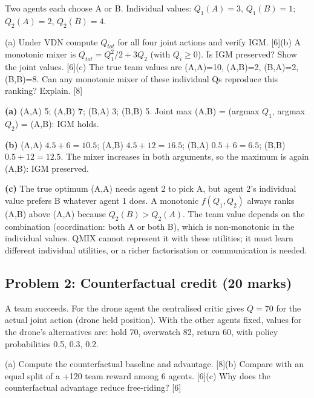 \documentclass[11pt]{article}
\begin{document}
\begin{prob}Two agents each choose A or B. Individual values: $Q_1(A)=3$, $Q_1(B)=1$; $Q_2(A)=2$, $Q_2(B)=4$.

(a) Under VDN compute $Q_{tot}$ for all four joint actions and verify IGM. [6]\newline (b) A monotonic mixer is $Q_{tot}=Q_1^2/2+3Q_2$ (with $Q_i\ge0$). Is IGM preserved? Show the joint values. [6]\newline (c) The true team values are (A,A)=10, (A,B)=2, (B,A)=2, (B,B)=8. Can any monotonic mixer of these individual Qs reproduce this ranking? Explain. [8]\end{prob}

\begin{soln}\textbf{(a)} (A,A) 5; (A,B) \textbf{7}; (B,A) 3; (B,B) 5. Joint max (A,B) = (argmax $Q_1$, argmax $Q_2$) = (A,B): IGM holds.

\textbf{(b)} (A,A) $4.5+6=10.5$; (A,B) $4.5+12=\mathbf{16.5}$; (B,A) $0.5+6=6.5$; (B,B) $0.5+12=12.5$. The mixer increases in both arguments, so the maximum is again (A,B): IGM preserved.

\textbf{(c)} The true optimum (A,A) needs agent 2 to pick A, but agent 2's individual value prefers B whatever agent 1 does. A monotonic $f(Q_1,Q_2)$ always ranks (A,B) above (A,A) because $Q_2(B)>Q_2(A)$. The team value depends on the combination (coordination: both A or both B), which is non-monotonic in the individual values. QMIX cannot represent it with these utilities; it must learn different individual utilities, or a richer factorisation or communication is needed.\end{soln}

\subsection{Problem 2: Counterfactual credit \normalfont\small\color{GreyN}(20 marks)}

\begin{prob}A team succeeds. For the drone agent the centralised critic gives $Q=70$ for the actual joint action (drone held position). With the other agents fixed, values for the drone's alternatives are: hold 70, overwatch 82, return 60, with policy probabilities 0.5, 0.3, 0.2.

(a) Compute the counterfactual baseline and advantage. [8]\newline (b) Compare with an equal split of a +120 team reward among 6 agents. [6]\newline (c) Why does the counterfactual advantage reduce free-riding? [6]\end{prob}
\end{document}
